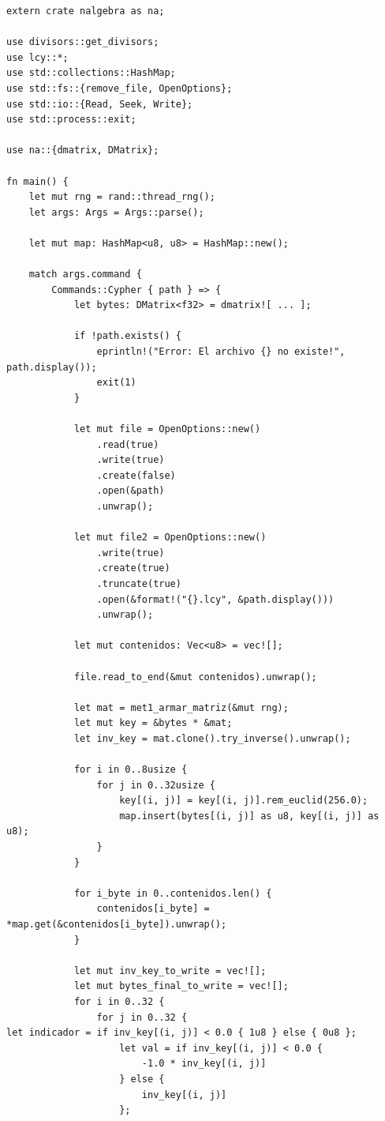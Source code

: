 \documentclass[a4paper]{article}
\begin{document}
\begin{verbatim}
extern crate nalgebra as na;

use divisors::get_divisors;
use lcy::*;
use std::collections::HashMap;
use std::fs::{remove_file, OpenOptions};
use std::io::{Read, Seek, Write};
use std::process::exit;

use na::{dmatrix, DMatrix};

fn main() {
    let mut rng = rand::thread_rng();
    let args: Args = Args::parse();

    let mut map: HashMap<u8, u8> = HashMap::new();

    match args.command {
        Commands::Cypher { path } => {
            let bytes: DMatrix<f32> = dmatrix![ ... ];

            if !path.exists() {
                eprintln!("Error: El archivo {} no existe!", path.display());
                exit(1)
            }

            let mut file = OpenOptions::new()
                .read(true)
                .write(true)
                .create(false)
                .open(&path)
                .unwrap();

            let mut file2 = OpenOptions::new()
                .write(true)
                .create(true)
                .truncate(true)
                .open(&format!("{}.lcy", &path.display()))
                .unwrap();

            let mut contenidos: Vec<u8> = vec![];

            file.read_to_end(&mut contenidos).unwrap();

            let mat = met1_armar_matriz(&mut rng);
            let mut key = &bytes * &mat;
            let inv_key = mat.clone().try_inverse().unwrap();

            for i in 0..8usize {
                for j in 0..32usize {
                    key[(i, j)] = key[(i, j)].rem_euclid(256.0);
                    map.insert(bytes[(i, j)] as u8, key[(i, j)] as u8);
                }
            }

            for i_byte in 0..contenidos.len() {
                contenidos[i_byte] = *map.get(&contenidos[i_byte]).unwrap();
            }

            let mut inv_key_to_write = vec![];
            let mut bytes_final_to_write = vec![];
            for i in 0..32 {
                for j in 0..32 {
let indicador = if inv_key[(i, j)] < 0.0 { 1u8 } else { 0u8 };
                    let val = if inv_key[(i, j)] < 0.0 {
                        -1.0 * inv_key[(i, j)]
                    } else {
                        inv_key[(i, j)]
                    };


\end{verbatim}
\end{document}
